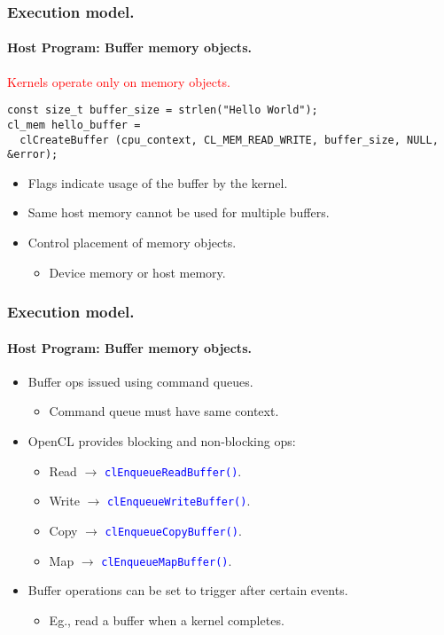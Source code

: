 \documentclass{beamer}
\newcommand{\func}[1]{\lstinline[basicstyle=\sffamily]{#1()}}
\begin{document}
\begin{frame}[fragile]
\frametitle{Execution model.}
\framesubtitle{Host Program: Buffer memory objects.}
  
\begin{center}
\textcolor{red}{Kernels operate only on memory objects.}
\end{center}

\begin{center}
\begin{minipage}{0.7\textwidth}
  \begin{lstlisting}
const size_t buffer_size = strlen("Hello World");
cl_mem hello_buffer = 
  clCreateBuffer (cpu_context, CL_MEM_READ_WRITE, buffer_size, NULL, &error);
  \end{lstlisting}
\end{minipage}
\end{center}

  \begin{itemize}
  \item Flags indicate usage of the buffer by the kernel.
  \item Same host memory cannot be used for multiple buffers.
  \item Control placement of memory objects.
    \begin{itemize}
    \item Device memory or host memory.
    \end{itemize}
  \end{itemize}
\end{frame}

\begin{frame}[fragile]
\frametitle{Execution model.}
\framesubtitle{Host Program: Buffer memory objects.}
  
  \begin{itemize}
  \item Buffer ops issued using command queues.
    \begin{itemize}
    \item Command queue must have same context.
    \end{itemize}
  \item OpenCL provides blocking and non-blocking ops:
    \begin{itemize}
    \item Read $\rightarrow{}$ \textcolor{blue}{\func{clEnqueueReadBuffer}}.
    \item Write $\rightarrow{}$ \textcolor{blue}{\func{clEnqueueWriteBuffer}}.
    \item Copy $\rightarrow{}$ \textcolor{blue}{\func{clEnqueueCopyBuffer}}.
    \item Map $\rightarrow{}$ \textcolor{blue}{\func{clEnqueueMapBuffer}}.
    \end{itemize}
  \item Buffer operations can be set to trigger after certain events.
    \begin{itemize}
    \item Eg., read a buffer when a kernel completes.
    \end{itemize}
  \end{itemize}
\end{frame}
\end{document}
